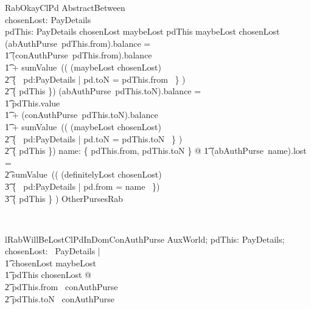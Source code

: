 \begin{LSDef}
\begin{schema}{RabOkayClPd}
  AbstractBetween
  \\ %
  chosenLost: \power PayDetails
  \\ %
  pdThis: PayDetails
\where %
  chosenLost \subseteq maybeLost
  \also %
  pdThis \in maybeLost \setminus chosenLost
  \also %
  (abAuthPurse~pdThis.from).balance =
  \\ %
  \t1 (conAuthPurse~pdThis.from).balance
  \\ %
  \t1 {} + sumValue~(( (maybeLost \setminus chosenLost)
  \\ %
  \t2 {} \cap \{~ pd:PayDetails | pd.toN = pdThis.from ~\} )
  \\ %
  \t2 \setminus \{ pdThis \})
  \also %
  (abAuthPurse~pdThis.toN).balance =
  \\ %
  \t1 pdThis.value
  \\ %
  \t1 {} + (conAuthPurse~pdThis.toN).balance
  \\ %
  \t1 {} + sumValue~(( (maybeLost \setminus chosenLost)
  \\ %
  \t2 {} \cap \{~ pd:PayDetails | pd.toN = pdThis.toN ~\} )
  \\ %
  \t2 \setminus \{ pdThis \})
  \also %
  \forall name: \{ pdThis.from, pdThis.toN \} @
  \also %
  \t1 (abAuthPurse~name).lost =
  \\ %
  \t2 sumValue~(( (definitelyLost \cup chosenLost)
  \\ %
  \t3 {} \cap \{~ pd:PayDetails | pd.from = name ~\})
  \\ %
  \t3 \setminus \{ pdThis \} )
  \also %
  OtherPursesRab
\end{schema}~\end{LSDef}

\begin{LNewLemma}
\begin{theorem}{lRabWillBeLostClPdInDomConAuthPurse}
    \forall AuxWorld; pdThis: PayDetails; chosenLost: \power~PayDetails | \\
        \t1 chosenLost \subseteq maybeLost \\
        \t1 \land pdThis \in chosenLost @ \\
            \t2 pdThis.from \in \dom~conAuthPurse \\
            \t2 \land pdThis.toN \in \dom~conAuthPurse
\end{theorem}~\end{LNewLemma}


